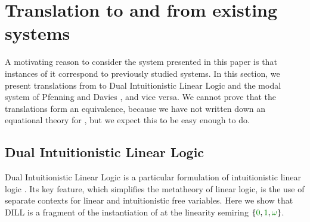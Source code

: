 \documentclass[submission,copyright,creativecommons]{eptcs}
\begin{document}
\section{Translation to and from existing systems}
\label{sec:translation}

A motivating reason to consider the system presented in this paper is that
instances of it correspond to previously studied systems.
In this section, we present translations from \name{} to Dual Intuitionistic
Linear Logic \cite{Barber1996} and the modal system of Pfenning and Davies
\cite{judgmental}, and vice versa.
We cannot prove that the translations form an equivalence, because we have not
written down an equational theory for \name{}, but we expect this to be easy
enough to do.

\subsection{Dual Intuitionistic Linear Logic}\label{sec:dill}
Dual Intuitionistic Linear Logic is a particular formulation of intuitionistic
linear logic \cite{Barber1996}.
Its key feature, which simplifies the metatheory of linear logic, is the use of
separate contexts for linear and intuitionistic free variables.
Here we show that DILL is a fragment of the instantiation of \name{} at the
linearity semiring $\{\zero, \linear, \unrestricted\}$.
\end{document}
